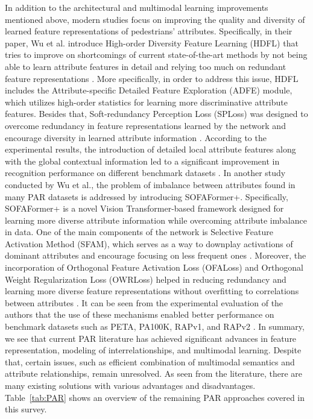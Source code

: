 \documentclass{ieeeaccess}
\begin{document}
In addition to the architectural and multimodal learning improvements mentioned above, modern studies focus on improving the quality and diversity of learned feature representations of pedestrians' attributes. Specifically, in their paper, Wu et al. introduce High-order Diversity Feature Learning (HDFL) that tries to improve on shortcomings of current state-of-the-art methods by not being able to learn attribute features in detail and relying too much on redundant feature representations \cite{bib9}. More specifically, in order to address this issue, HDFL includes the Attribute-specific Detailed Feature Exploration (ADFE) module, which utilizes high-order statistics for learning more discriminative attribute features. Besides that, Soft-redundancy Perception Loss (SPLoss) was designed to overcome redundancy in feature representations learned by the network and encourage diversity in learned attribute information \cite{bib9}. According to the experimental results, the introduction of detailed local attribute features along with the global contextual information led to a significant improvement in recognition performance on different benchmark datasets \cite{bib9}. In another study conducted by Wu et al.\cite{bib10}, the problem of imbalance between attributes found in many PAR datasets is addressed by introducing SOFAFormer+. Specifically, SOFAFormer+ is a novel Vision Transformer-based framework designed for learning more diverse attribute information while overcoming attribute imbalance in data. One of the main components of the network is Selective Feature Activation Method (SFAM), which serves as a way to downplay activations of dominant attributes and encourage focusing on less frequent ones \cite{bib10}. Moreover, the incorporation of Orthogonal Feature Activation Loss (OFALoss) and Orthogonal Weight Regularization Loss (OWRLoss) helped in reducing redundancy and learning more diverse feature representations without overfitting to correlations between attributes \cite{bib10}. It can be seen from the experimental evaluation of the authors that the use of these mechanisms enabled better performance on benchmark datasets such as PETA, PA100K, RAPv1, and RAPv2 \cite{bib10}. In summary, we see that current PAR literature has achieved significant advances in feature representation, modeling of interrelationships, and multimodal learning. Despite that, certain issues, such as efficient combination of multimodal semantics and attribute relationships, remain unresolved. As seen from the literature, there are many existing solutions with various advantages and disadvantages. Table~\ref{tab:PAR} shows an overview of the remaining PAR approaches covered in this survey.
\end{document}
